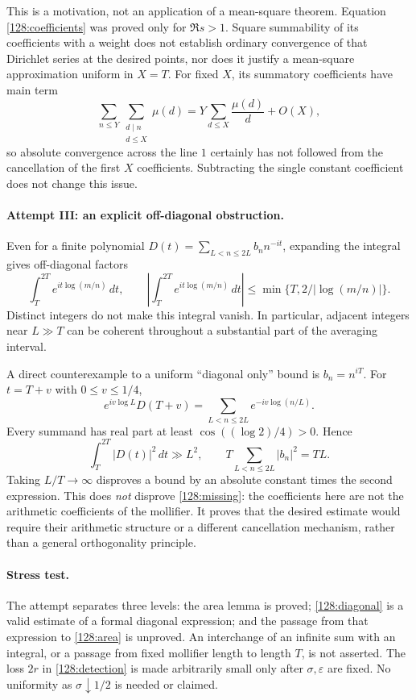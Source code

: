 \documentclass[11pt,a4paper]{article}
\numberwithin{equation}{section}
\begin{document}
This is a motivation, not an application of a mean-square theorem.
Equation \eqref{128:coefficients} was proved only for $\Re s>1$.
Square summability of its coefficients with a weight does not establish
ordinary convergence of that Dirichlet series at the desired points,
nor does it justify a mean-square approximation uniform in $X=T$.
For fixed $X$, its summatory coefficients have main term
\[
 \sum_{n\leq Y}\sum_{\substack{d\mid n\\d\leq X}}\mu(d)
   =Y\sum_{d\leq X}\frac{\mu(d)}d+O(X),
\]
so absolute convergence across the line $1$ certainly has not followed
from the cancellation of the first $X$ coefficients.  Subtracting the
single constant coefficient does not change this issue.

\paragraph{Attempt III: an explicit off-diagonal obstruction.}
Even for a finite polynomial $D(t)=\sum_{L<n\leq2L}b_n n^{-it}$,
expanding the integral gives off-diagonal factors
\[
 \int_T^{2T}e^{it\log(m/n)}\,dt,
 \qquad
 \left|\int_T^{2T}e^{it\log(m/n)}\,dt\right|
 \leq\min\{T,2/|\log(m/n)|\}.
\]
Distinct integers do not make this integral vanish.  In particular,
adjacent integers near $L\gg T$ can be coherent throughout a substantial
part of the averaging interval.

A direct counterexample to a uniform ``diagonal only'' bound is
$b_n=n^{iT}$.  For $t=T+v$ with $0\leq v\leq1/4$,
\[
 e^{iv\log L}D(T+v)=\sum_{L<n\leq2L}e^{-iv\log(n/L)}.
\]
Every summand has real part at least $\cos((\log2)/4)>0$.  Hence
\[
 \int_T^{2T}|D(t)|^2\,dt\gg L^2,
 \qquad T\sum_{L<n\leq2L}|b_n|^2=TL.
\]
Taking $L/T\to\infty$ disproves a bound by an absolute constant times
the second expression.  This does \emph{not} disprove
\eqref{128:missing}: the coefficients here are not the arithmetic
coefficients of the mollifier.  It proves that the desired estimate
would require their arithmetic structure or a different cancellation
mechanism, rather than a general orthogonality principle.

\paragraph{Stress test.}
The attempt separates three levels: the area lemma is proved;
\eqref{128:diagonal} is a valid estimate of a formal diagonal expression;
and the passage from that expression to \eqref{128:area} is unproved.
An interchange of an infinite sum with an integral, or a passage from
fixed mollifier length to length $T$, is not asserted.  The loss
$2r$ in \eqref{128:detection} is made arbitrarily small only after
$\sigma,\varepsilon$ are fixed.  No uniformity as $\sigma\downarrow1/2$
is needed or claimed.
\end{document}
